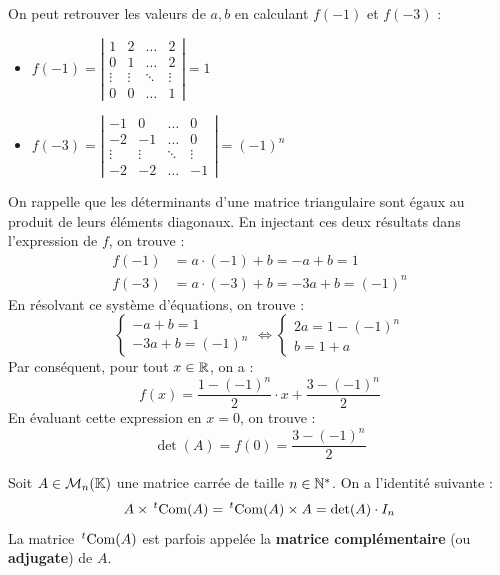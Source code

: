 \documentclass[12pt, a4paper]{report}
\begin{document}
\begin{outline}
    \1 On peut retrouver les valeurs de $a,b$ en calculant $f(-1)$ et $f(-3)$ :
    \begin{itemize}
        \item $f(-1) = \left|\begin{matrix} 1 & 2 & \dots & 2 \\ 0 & 1 & \dots & 2 \\ \vdots & \vdots & \ddots & \vdots \\ 0 & 0 & \dots & 1 \end{matrix}\right| = 1$
        \item $f(-3) = \left|\begin{matrix} -1 & 0 & \dots & 0 \\ -2 & -1 & \dots & 0 \\ \vdots & \vdots & \ddots & \vdots \\ -2 & -2 & \dots & -1 \end{matrix}\right| = (-1)^n$
    \end{itemize}
    On rappelle que les déterminants d'une matrice triangulaire sont égaux au produit de leurs éléments diagonaux. En injectant ces deux résultats dans l'expression de $f$, on trouve :
    \begin{align*}
        f(-1) &= a \cdot (-1) + b = -a + b = 1 \\
        f(-3) &= a \cdot (-3) + b = -3a + b = (-1)^n
    \end{align*}
    En résolvant ce système d'équations, on trouve :
    $$\begin{cases}
        -a + b = 1 \\
        -3a + b = (-1)^n
    \end{cases} \iff \begin{cases}
        2a = 1 - (-1)^n \\
        b = 1 + a
    \end{cases}$$
    Par conséquent, pour tout $x \in \mathbb{R}$, on a :
    $$f(x) = \frac{1 - (-1)^n}{2} \cdot x + \frac{3 - (-1)^n}{2}$$
    En évaluant cette expression en $x=0$, on trouve :
    $$\det(A) = f(0) = \frac{3 - (-1)^n}{2}$$
\end{outline}

\begin{property}
    Soit $A \in \mathcal{M}_n(\mathbb{K})$ une matrice carrée de taille $n \in \mathbb{N}^*$. On a l'identité suivante :
    $$A \times \,^t\mathrm{Com}(A) = \,^t\mathrm{Com}(A) \times A = \det(A) \cdot I_n$$
    La matrice $\,^t\mathrm{Com}(A)$ est parfois appelée la \textbf{matrice complémentaire} (ou \textbf{adjugate}) de $A$.
\end{property}
\end{document}
